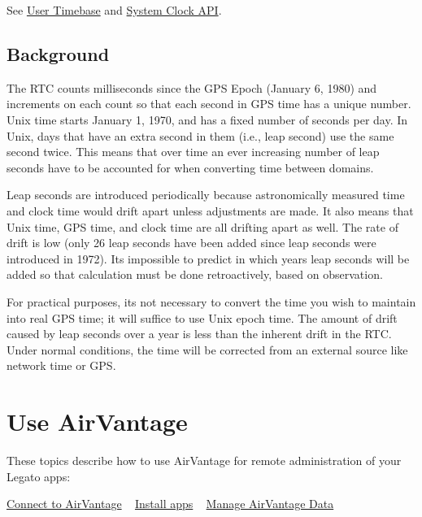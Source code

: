 See \hyperlink{c_rtc}{User Timebase} and \hyperlink{c_clock}{System Clock A\+P\+I}.\hypertarget{how_to_set_user_timebase_howToSetUserTimebase_background}{}\subsection{Background}\label{how_to_set_user_timebase_howToSetUserTimebase_background}
The R\+T\+C counts milliseconds since the G\+P\+S Epoch (January 6, 1980) and increments on each count so that each second in G\+P\+S time has a unique number. Unix time starts January 1, 1970, and has a fixed number of seconds per day. In Unix, days that have an extra second in them (i.\+e., leap second) use the same second twice. This means that over time an ever increasing number of leap seconds have to be accounted for when converting time between domains.

Leap seconds are introduced periodically because astronomically measured time and clock time would drift apart unless adjustments are made. It also means that Unix time, G\+P\+S time, and clock time are all drifting apart as well. The rate of drift is low (only 26 leap seconds have been added since leap seconds were introduced in 1972). It\textquotesingle{}s impossible to predict in which years leap seconds will be added so that calculation must be done retroactively, based on observation.

For practical purposes, it\textquotesingle{}s not necessary to convert the time you wish to maintain into real G\+P\+S time; it will suffice to use Unix epoch time. The amount of drift caused by leap seconds over a year is less than the inherent drift in the R\+T\+C. Under normal conditions, the time will be corrected from an external source like network time or G\+P\+S.



 \hypertarget{howToAV}{}\section{Use Air\+Vantage}\label{howToAV}
These topics describe how to use Air\+Vantage for remote administration of your Legato apps\+:

\hyperlink{howToAVConnect}{Connect to Air\+Vantage} ~\newline
 \hyperlink{howToAVInstallApp}{Install apps} ~\newline
 \hyperlink{howToAVData}{Manage Air\+Vantage Data}





